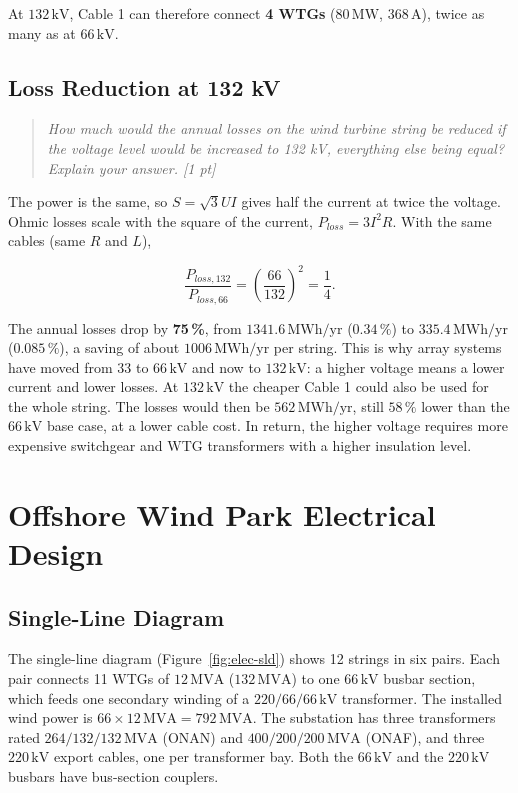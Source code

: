 At $132\,\mathrm{kV}$, Cable 1 can therefore connect \textbf{4 WTGs} ($80\,\mathrm{MW}$, $368\,\mathrm{A}$), twice as many as at $66\,\mathrm{kV}$.

\subsection{Loss Reduction at 132 kV}
\label{sec:elec-132-loss}
\begin{quote}
\emph{How much would the annual losses on the wind turbine string be reduced if the voltage level would be increased to 132 kV, everything else being equal? Explain your answer. [1 pt]}
\end{quote}

The power is the same, so $S = \sqrt{3}UI$ gives half the current at twice the voltage. Ohmic losses scale with the square of the current, $P_{loss} = 3I^2R$. With the same cables (same $R$ and $L$),

\begin{equation}
    \frac{P_{loss,132}}{P_{loss,66}} = \left(\frac{66}{132}\right)^2 = \frac{1}{4}.
    \label{eq:elec-lossratio}
\end{equation}

The annual losses drop by \textbf{75\,\%}, from $1341.6\,\mathrm{MWh/yr}$ ($0.34\,\%$) to $335.4\,\mathrm{MWh/yr}$ ($0.085\,\%$), a saving of about $1006\,\mathrm{MWh/yr}$ per string. This is why array systems have moved from $33$ to $66\,\mathrm{kV}$ and now to $132\,\mathrm{kV}$: a higher voltage means a lower current and lower losses. At $132\,\mathrm{kV}$ the cheaper Cable 1 could also be used for the whole string. The losses would then be $562\,\mathrm{MWh/yr}$, still $58\,\%$ lower than the $66\,\mathrm{kV}$ base case, at a lower cable cost. In return, the higher voltage requires more expensive switchgear and WTG transformers with a higher insulation level.

\section{Offshore Wind Park Electrical Design}
\label{sec:elec-part3}

\subsection{Single-Line Diagram}
\label{sec:elec-sld}
The single-line diagram (Figure~\ref{fig:elec-sld}) shows 12 strings in six pairs. Each pair connects 11 WTGs of $12\,\mathrm{MVA}$ ($132\,\mathrm{MVA}$) to one $66\,\mathrm{kV}$ busbar section, which feeds one secondary winding of a $220/66/66\,\mathrm{kV}$ transformer. The installed wind power is $66 \times 12\,\mathrm{MVA} = 792\,\mathrm{MVA}$. The substation has three transformers rated $264/132/132\,\mathrm{MVA}$ (ONAN) and $400/200/200\,\mathrm{MVA}$ (ONAF), and three $220\,\mathrm{kV}$ export cables, one per transformer bay. Both the $66\,\mathrm{kV}$ and the $220\,\mathrm{kV}$ busbars have bus-section couplers.


